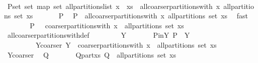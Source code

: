 \begin{isabellebody}
\ \isamarkupfalse%
\ P{\isacharunderscore}set{\isacharcolon}\ {\isachardoublequoteopen}set\ {\isacharparenleft}map\ set\ {\isacharparenleft}all{\isacharunderscore}partitions{\isacharunderscore}list\ {\isacharparenleft}x\ {\isacharhash}\ xs{\isacharparenright}{\isacharparenright}{\isacharparenright}\ {\isacharequal}\ all{\isacharunderscore}coarser{\isacharunderscore}partitions{\isacharunderscore}with\ x\ {\isacharparenleft}all{\isacharunderscore}partitions\ {\isacharparenleft}set\ xs{\isacharparenright}{\isacharparenright}{\isachardoublequoteclose}\ \isacommand{{\isachardot}}\isamarkupfalse%
\isanewline
\isanewline
\ \ \ \ \isamarkupfalse%
\ P\ \isamarkupfalse%
\ {\isachardoublequoteopen}P\ {\isasymin}\ all{\isacharunderscore}coarser{\isacharunderscore}partitions{\isacharunderscore}with\ x\ {\isacharparenleft}all{\isacharunderscore}partitions\ {\isacharparenleft}set\ xs{\isacharparenright}{\isacharparenright}{\isachardoublequoteclose}\ \isamarkupfalse%
\ fast\isanewline
\ \ \ \ \isamarkupfalse%
\ \isamarkupfalse%
\ {\isachardoublequoteopen}P\ {\isasymin}\ {\isasymUnion}\ {\isacharparenleft}coarser{\isacharunderscore}partitions{\isacharunderscore}with\ x\ {\isacharbackquote}\ {\isacharparenleft}all{\isacharunderscore}partitions\ {\isacharparenleft}set\ xs{\isacharparenright}{\isacharparenright}{\isacharparenright}{\isachardoublequoteclose}\isanewline
\ \ \ \ \ \ \isamarkupfalse%
\ all{\isacharunderscore}coarser{\isacharunderscore}partitions{\isacharunderscore}with{\isacharunderscore}def\ \isacommand{{\isachardot}}\isamarkupfalse%
\isanewline
\ \ \ \ \isamarkupfalse%
\ \isamarkupfalse%
\ Y\isanewline
\ \ \ \ \ \ \ P{\isacharunderscore}in{\isacharunderscore}Y{\isacharcolon}\ {\isachardoublequoteopen}P\ {\isasymin}\ Y{\isachardoublequoteclose}\isanewline
\ \ \ \ \ \ \ \ \ Y{\isacharunderscore}coarser{\isacharcolon}\ {\isachardoublequoteopen}Y\ {\isasymin}\ coarser{\isacharunderscore}partitions{\isacharunderscore}with\ x\ {\isacharbackquote}\ {\isacharparenleft}all{\isacharunderscore}partitions\ {\isacharparenleft}set\ xs{\isacharparenright}{\isacharparenright}{\isachardoublequoteclose}\ \isacommand{{\isachardot}{\isachardot}}\isamarkupfalse%
\isanewline
\ \ \ \ \isamarkupfalse%
\ Y{\isacharunderscore}coarser\ \isamarkupfalse%
\ Q\isanewline
\ \ \ \ \ \ \ Q{\isacharunderscore}part{\isacharunderscore}xs{\isacharcolon}\ {\isachardoublequoteopen}Q\ {\isasymin}\ all{\isacharunderscore}partitions\ {\isacharparenleft}set\ xs{\isacharparenright}{\isachardoublequoteclose}\isanewline

\end{isabellebody}
